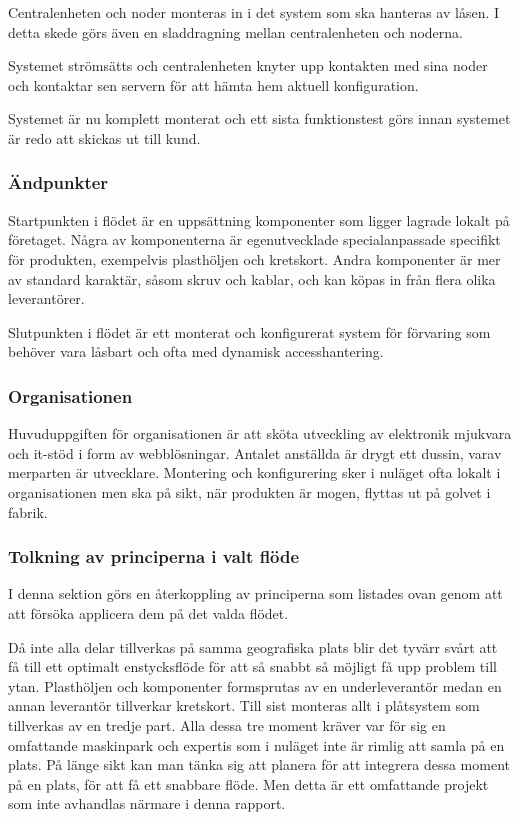 \documentclass{article}
\begin{document}
Centralenheten och noder monteras in i det system som ska hanteras av låsen. I detta skede görs även en sladdragning mellan centralenheten och noderna.

Systemet strömsätts och centralenheten knyter upp kontakten med sina noder och  kontaktar sen servern för att hämta hem aktuell konfiguration.

Systemet är nu komplett monterat och ett sista funktionstest görs innan systemet är redo att skickas ut till kund.

\subsubsection*{Ändpunkter}
Startpunkten i flödet är en uppsättning komponenter som ligger lagrade lokalt på företaget. Några av komponenterna är egenutvecklade specialanpassade specifikt för produkten, exempelvis plasthöljen och kretskort. Andra komponenter är mer av standard karaktär, såsom skruv och kablar, och kan köpas in från flera olika leverantörer.

Slutpunkten i flödet är ett monterat och konfigurerat system för förvaring som behöver vara låsbart och ofta med dynamisk accesshantering.

\subsubsection*{Organisationen} 
Huvuduppgiften för organisationen är att sköta utveckling av elektronik mjukvara och it-stöd i form av webblösningar. Antalet anställda är drygt ett dussin, varav merparten är utvecklare. Montering och konfigurering sker i nuläget ofta lokalt i organisationen men ska på sikt, när produkten är mogen, flyttas ut på golvet i fabrik.

\subsubsection*{Tolkning av principerna i valt flöde}
I denna sektion görs en återkoppling av principerna som listades ovan genom att att försöka applicera dem på det valda flödet. 

Då inte alla delar tillverkas på samma geografiska plats blir det tyvärr svårt att få till ett optimalt enstycksflöde för att så snabbt så möjligt få upp problem till ytan. Plasthöljen och komponenter formsprutas av en underleverantör medan en annan leverantör tillverkar kretskort. Till sist monteras allt i plåtsystem som tillverkas av en tredje part. Alla dessa tre moment kräver var för sig en omfattande maskinpark och expertis som i nuläget inte är rimlig att samla på en plats. På länge sikt kan man tänka sig att planera för att integrera dessa moment på en plats, för att få ett snabbare flöde. Men detta är ett omfattande projekt som inte avhandlas närmare i denna rapport. 
 
\end{document}
